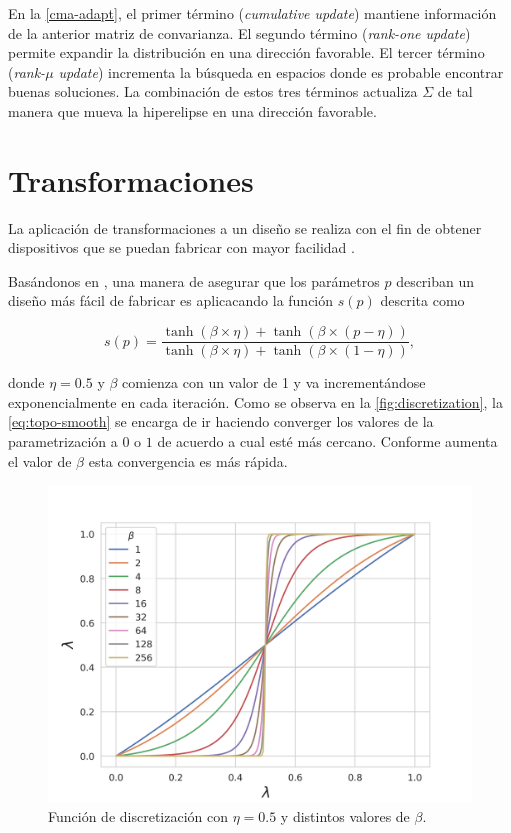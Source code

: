 En la \autoref{cma-adapt}, el primer término (\emph{cumulative update}) 
mantiene información de la anterior matriz de convarianza.
El segundo término (\emph{rank-one update}) permite expandir la distribución en
una dirección favorable.
El tercer término (\emph{rank-$\mu$ update}) incrementa la búsqueda en espacios
donde es probable encontrar buenas soluciones.
La combinación de estos tres términos actualiza $\Sigma$ de tal manera que
mueva la hiperelipse en una dirección favorable.

\section{Transformaciones}\label{sec:transformations}

La aplicación de transformaciones a un diseño se realiza con el fin de obtener
dispositivos que se puedan fabricar con mayor facilidad \citep{Su2020}. 

Basándonos en \cite{Zhang2021}, una manera de asegurar que los
parámetros $p$ describan un diseño más fácil de fabricar es aplicacando la función $s(p)$
descrita como

\begin{equation}
  s(p) = \frac{\tanh (\beta \times \eta) + \tanh (\beta \times (p
  - \eta))}{\tanh (\beta \times \eta) + \tanh (\beta \times (1 - \eta))},
  \label{eq:topo-smooth}
\end{equation}

    donde $\eta = 0.5$ y $\beta$ comienza con un valor de 1 y va incrementándose exponencialmente en cada iteración. 
    Como se observa en la \autoref{fig:discretization}, la \autoref{eq:topo-smooth} se encarga de ir haciendo converger los valores de la parametrización a $0$ o $1$ de acuerdo a cual esté más cercano. 
    Conforme aumenta el valor de $\beta$ esta convergencia es más rápida.

    \begin{figure}[ht]
      \centering
      \includegraphics[scale=0.8]{image/theory/discretization.png}
      \caption{Función de discretización con $\eta = 0.5$ y distintos valores
      de $\beta$.}
      \label{fig:discretization}
    \end{figure}

